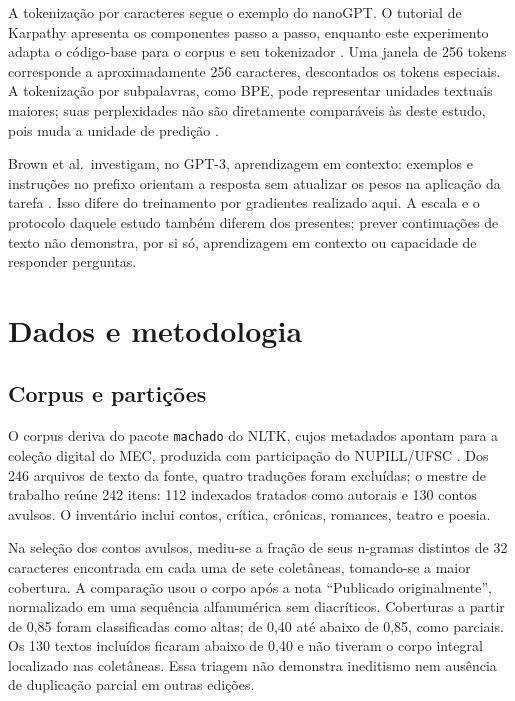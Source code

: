 \documentclass[conference]{IEEEtran}
\begin{document}
A tokenização por caracteres segue o exemplo  do nanoGPT. O tutorial de Karpathy apresenta os componentes passo a passo, enquanto este experimento adapta o código-base para o corpus e seu tokenizador \cite{karpathyNanoGPT,karpathyTutorial}. Uma janela de 256 tokens corresponde a aproximadamente 256 caracteres, descontados os tokens especiais. A tokenização por subpalavras, como BPE, pode representar unidades textuais maiores; suas perplexidades não são diretamente comparáveis às deste estudo, pois muda a unidade de predição \cite{radford2019}.

Brown et al.\ investigam, no GPT-3, aprendizagem em contexto: exemplos e instruções no prefixo orientam a resposta sem atualizar os pesos na aplicação da tarefa \cite{brown2020}. Isso difere do treinamento por gradientes realizado aqui. A escala e o protocolo daquele estudo também diferem dos presentes; prever continuações de texto não demonstra, por si só, aprendizagem em contexto ou capacidade de responder perguntas.

\section{Dados e metodologia}

\subsection{Corpus e partições}

O corpus deriva do pacote \texttt{machado} do NLTK, cujos metadados apontam para a coleção digital do MEC, produzida com participação do NUPILL/UFSC \cite{nltkMachado,mecMachado}. Dos 246 arquivos de texto da fonte, quatro traduções foram excluídas; o mestre de trabalho reúne 242 itens: 112 indexados tratados como autorais e 130 contos avulsos. O inventário inclui contos, crítica, crônicas, romances, teatro e poesia.

Na seleção dos contos avulsos, mediu-se a fração de seus n-gramas distintos de 32 caracteres encontrada em cada uma de sete coletâneas, tomando-se a maior cobertura. A comparação usou o corpo após a nota ``Publicado originalmente'', normalizado em uma sequência alfanumérica sem diacríticos. Coberturas a partir de 0,85 foram classificadas como altas; de 0,40 até abaixo de 0,85, como parciais. Os 130 textos incluídos ficaram abaixo de 0,40 e não tiveram o corpo integral localizado nas coletâneas. Essa triagem não demonstra ineditismo nem ausência de duplicação parcial em outras edições.
\end{document}
